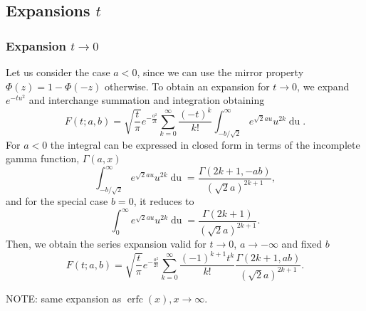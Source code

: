 \documentclass[10pt,a4paper,oneside]{article}
\DeclareMathOperator{\erfc}{erfc}
\numberwithin{equation}{section}
\begin{document}
\subsection{Expansions $t$}

\subsubsection{Expansion $t \to 0$}

Let us consider the case $a < 0$, since we can use the mirror property $\Phi(z) = 1 - \Phi(-z)$ otherwise. To obtain an expansion for $t \to 0$, we expand $e^{-tu^2}$ and interchange summation and integration obtaining
\begin{equation*}
F(t; a, b) = \sqrt{\frac{t}{\pi}} e^{-\frac{a^2}{2t}} \sum_{k=0}^{\infty} \frac{(-t)^k}{k!}\int_{-b/\sqrt{2}}^{\infty} e^{\sqrt{2}a u} u^{2k}\mathop{du}.
\end{equation*}
For $a < 0$ the integral can be expressed in closed form in terms of the incomplete gamma function, $\Gamma(a, x)$
\begin{equation*}
\int_{-b/\sqrt{2}}^{\infty} e^{\sqrt{2}a u} u^{2k}\mathop{du} = \frac{\Gamma(2k+1, -ab)}{(\sqrt{2}a)^{2k+1}},
\end{equation*}
and for the special case $b=0$, it reduces to
\begin{equation*}
\int_{0}^{\infty} e^{\sqrt{2}a u} u^{2k}\mathop{du} = \frac{\Gamma(2k+1)}{(\sqrt{2}a)^{2k+1}}.
\end{equation*}
Then, we obtain the series expansion valid for $t \to 0$, $a \to -\infty$ and fixed $b$
\begin{equation}\label{phi_expansion_incgamma_t_small}
F(t; a, b) = \sqrt{\frac{t}{\pi}} e^{-\frac{a^2}{2t}} \sum_{k=0}^{\infty} \frac{(-1)^{k+1} t^k}{k!}\frac{\Gamma(2k + 1, ab)}{(\sqrt{2}a)^{2k+1}}.
\end{equation}

NOTE: same expansion as $\erfc(x), x \to \infty$.
\end{document}
